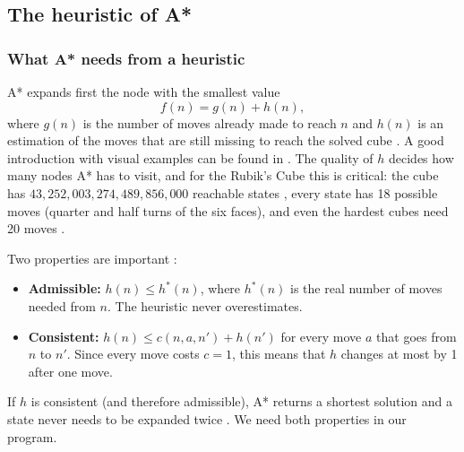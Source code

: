 
\subsection{The heuristic of A*}
\label{sec:heuristic}

\subsubsection{What A* needs from a heuristic}
A* expands first the node with the smallest value
\begin{equation}
    f(n) = g(n) + h(n),
\end{equation}
where $g(n)$ is the number of moves already made to reach $n$ and $h(n)$ is an estimation of the moves that are still missing to reach the solved cube \cite{aima3, hart1968}. A good introduction with visual examples can be found in \cite{patel2014}. The quality of $h$ decides how many nodes A* has to visit, and for the Rubik's Cube this is critical: the cube has $43{,}252{,}003{,}274{,}489{,}856{,}000$ reachable states \cite{korf1997, cube20}, every state has 18 possible moves (quarter and half turns of the six faces), and even the hardest cubes need 20 moves \cite{rokicki2013}.

Two properties are important \cite[pp.~94--95]{aima3}:
\begin{itemize}
    \item \textbf{Admissible:} $h(n) \le h^{*}(n)$, where $h^{*}(n)$ is the real number of moves needed from $n$. The heuristic never overestimates.
    \item \textbf{Consistent:} $h(n) \le c(n,a,n') + h(n')$ for every move $a$ that goes from $n$ to $n'$. Since every move costs $c = 1$, this means that $h$ changes at most by 1 after one move.
\end{itemize}
If $h$ is consistent (and therefore admissible), A* returns a shortest solution and a state never needs to be expanded twice \cite[p.~95]{aima3}. We need both properties in our program.

